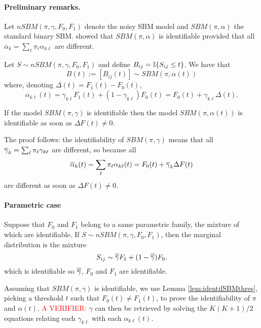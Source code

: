 \paragraph{Preliminary remarks.}
Let $nSBM(\pi, \gamma, F_0, F_1)$ denote the noisy SBM model and $SBM(\pi, \alpha)$ the standard binary SBM. \cite{CDP12} showed that $SBM(\pi, \alpha)$ is identifiable provided that all $\overline{\alpha}_k = \sum_\ell \pi_\ell \alpha_{k\ell}$ are different.

\begin{lemma} \label{lem:SBMthres}
 Let $S \sim nSBM(\pi, \gamma, F_0, F_1)$ and define $B_{ij} = \mathbb I\{S_{ij} \leq t\}$. We have that 
 $$
 B(t) := [B_{ij}(t)] \sim SBM(\pi, \alpha(t))
 $$
 where, denoting $\Delta (t) = F_1(t) - F_0(t)$,
 $$
 \alpha_{k\ell}(t) 
 = \gamma_{k\ell} F_1(t) + (1 - \gamma_{k\ell}) F_0(t)
 = F_0(t) + \gamma_{k\ell} \Delta  (t). 
 $$
\end{lemma}

\begin{lemma} \label{lem:identifSBMthres}
  If the model $SBM(\pi, \gamma)$ is identifiable then the model $SBM(\pi, \alpha(t))$ is identifiable as soon as $\Delta F(t) \neq 0$.
\end{lemma}

The proof follows: the identifiability of $SBM(\pi, \gamma)$ means that all $\overline{\gamma}_k  = \sum_\ell \pi_\ell \gamma_{k\ell}$ are different, so because all 
$$
\overline{\alpha}_k(t) = \sum_\ell \pi_\ell \alpha_{k\ell}(t) = F_0(t) + \overline{\gamma}_k \Delta F(t)
$$
are different as soon as $\Delta F(t) \neq 0$.

\paragraph{Parametric case}
Suppose that $F_0$ and $F_1$ belong to a same parametric family, the mixture of which are identifiable. If $S \sim nSBM(\pi, \gamma, F_0, F_1)$, then the marginal distribution is the mixture
$$
S_{ij} \sim \overline{\overline{\gamma}} F_1 + (1 - \overline{\overline{\gamma}}) F_0,
$$
which is identifiable so $\overline{\overline{\gamma}}$, $F_0$ and $F_1$ are identifiable.

Assuming that $SBM(\pi, \gamma)$ is identifiable, we use Lemma \ref{lem:identifSBMthres}, picking a threshold $t$ such that $F_0(t) \neq F_1(t)$, to prove the identifiability of $\pi$ and $\alpha(t)$. \textcolor{red}{A VERIFIER:} $\gamma$ can then be retrieved by solving the $K(K+1)/2$ equations relating each $\gamma_{k\ell}$ with each $\alpha_{k\ell}(t)$. 

